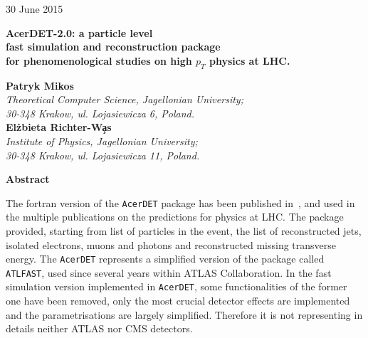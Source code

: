 \begin{titlepage}

\begin{flushright}
{\rm   30 June  2015}
\end{flushright}


\begin{center}
\vspace{2.0cm} 
  {\bf \LARGE AcerDET-2.0: a particle level } \\
\vspace{0.25cm} 
  {\bf \LARGE fast simulation and reconstruction package} \\
\vspace{0.25cm} 
  {\bf \LARGE for  phenomenological studies on high $p_T$ physics at LHC.}\\
\end{center}
\vspace{1.0cm} 
 

\begin{center}
  {\bf Patryk Mikos}\\ 
  {\em Theoretical Computer Science, Jagellonian University;}\\
  {\em 30-348 Krakow, ul. Lojasiewicza 6, Poland.}\\
   {\bf El\. zbieta Richter-W\c{a}s}\\ 
  {\em Institute of Physics, Jagellonian University;}\\
  {\em 30-348 Krakow, ul. Lojasiewicza 11, Poland.}\\
 
\end{center}

\vspace{1.0cm}
\begin{center}
{\bf Abstract}
\end{center}


The fortran version of the  {\tt AcerDET} package has been published in~\cite{AcerDET-1.0},
and used in the multiple publications on the predictions for physics at LHC.
The package provided, starting from list of particles in the event, the list of 
reconstructed jets, isolated electrons, muons and photons and
reconstructed missing transverse energy.
The {\tt AcerDET} represents a simplified version of the package called
{\tt ATLFAST}, used since several years within ATLAS Collaboration.
In the fast simulation version implemented in {\tt AcerDET}, some functionalities of the 
former one have been removed, only the most crucial detector effects are
implemented and the  parametrisations are largely simplified.
Therefore it is not representing in details neither ATLAS nor
CMS detectors.


\end{titlepage}
